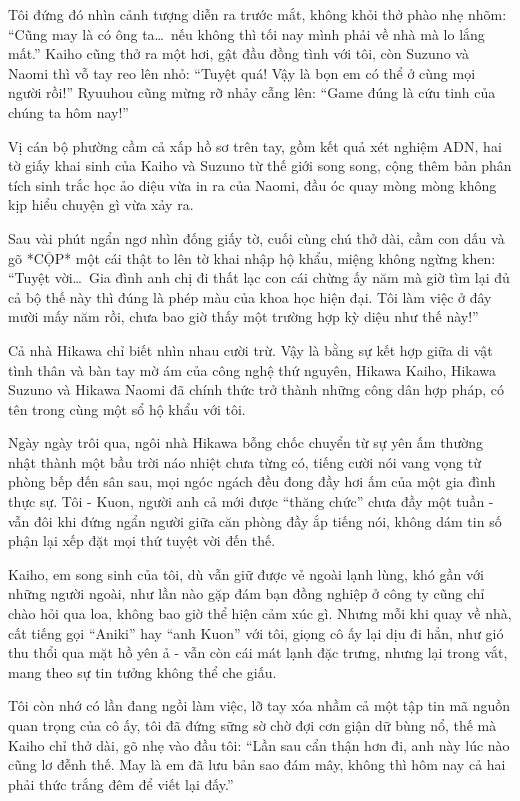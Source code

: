 ﻿\documentclass[../main.tex]{subfiles}
\begin{document}
Tôi đứng đó nhìn cảnh tượng diễn ra trước mắt, không khỏi thở phào nhẹ nhõm: ``Cũng may là có ông ta\dots\ nếu không thì tối nay mình phải về nhà mà lo lắng mất.'' Kaiho cũng thở ra một hơi, gật đầu đồng tình với tôi, còn Suzuno và Naomi thì vỗ tay reo lên nhỏ: ``Tuyệt quá! Vậy là bọn em có thể ở cùng mọi người rồi!'' Ryuuhou cũng mừng rỡ nhảy cẫng lên: ``Game đúng là cứu tinh của chúng ta hôm nay!''

Vị cán bộ phường cầm cả xấp hồ sơ trên tay, gồm kết quả xét nghiệm ADN, hai tờ giấy khai sinh của Kaiho và Suzuno từ thế giới song song, cộng thêm bản phân tích sinh trắc học ảo diệu vừa in ra của Naomi, đầu óc quay mòng mòng không kịp hiểu chuyện gì vừa xảy ra.

Sau vài phút ngẩn ngơ nhìn đống giấy tờ, cuối cùng chú thở dài, cầm con dấu và gõ *CỘP* một cái thật to lên tờ khai nhập hộ khẩu, miệng không ngừng khen: ``Tuyệt vời\dots\ Gia đình anh chị đi thất lạc con cái chừng ấy năm mà giờ tìm lại đủ cả bộ thế này thì đúng là phép màu của khoa học hiện đại. Tôi làm việc ở đây mười mấy năm rồi, chưa bao giờ thấy một trường hợp kỳ diệu như thế này!''

Cả nhà Hikawa chỉ biết nhìn nhau cười trừ. Vậy là bằng sự kết hợp giữa di vật tình thân và bàn tay mờ ám của công nghệ thứ nguyên, Hikawa Kaiho, Hikawa Suzuno và Hikawa Naomi đã chính thức trở thành những công dân hợp pháp, có tên trong cùng một sổ hộ khẩu với tôi.

\omk

Ngày ngày trôi qua, ngôi nhà Hikawa bỗng chốc chuyển từ sự yên ấm thường nhật thành một bầu trời náo nhiệt chưa từng có, tiếng cười nói vang vọng từ phòng bếp đến sân sau, mọi ngóc ngách đều đong đầy hơi ấm của một gia đình thực sự. Tôi - Kuon, người anh cả mới được ``thăng chức'' chưa đầy một tuần - vẫn đôi khi đứng ngẩn người giữa căn phòng đầy ắp tiếng nói, không dám tin số phận lại xếp đặt mọi thứ tuyệt vời đến thế.

Kaiho, em song sinh của tôi, dù vẫn giữ được vẻ ngoài lạnh lùng, khó gần với những người ngoài, như lần nào gặp đám bạn đồng nghiệp ở công ty cũng chỉ chào hỏi qua loa, không bao giờ thể hiện cảm xúc gì. Nhưng mỗi khi quay về nhà, cất tiếng gọi ``Aniki'' hay ``anh Kuon'' với tôi, giọng cô ấy lại dịu đi hẳn, như gió thu thổi qua mặt hồ yên ả - vẫn còn cái mát lạnh đặc trưng, nhưng lại trong vắt, mang theo sự tin tưởng không thể che giấu.

Tôi còn nhớ có lần đang ngồi làm việc, lỡ tay xóa nhầm cả một tập tin mã nguồn quan trọng của cô ấy, tôi đã đứng sững sờ chờ đợi cơn giận dữ bùng nổ, thế mà Kaiho chỉ thở dài, gõ nhẹ vào đầu tôi: ``Lần sau cẩn thận hơn đi, anh này lúc nào cũng lơ đễnh thế. May là em đã lưu bản sao đám mây, không thì hôm nay cả hai phải thức trắng đêm để viết lại đấy.''
\end{document}

